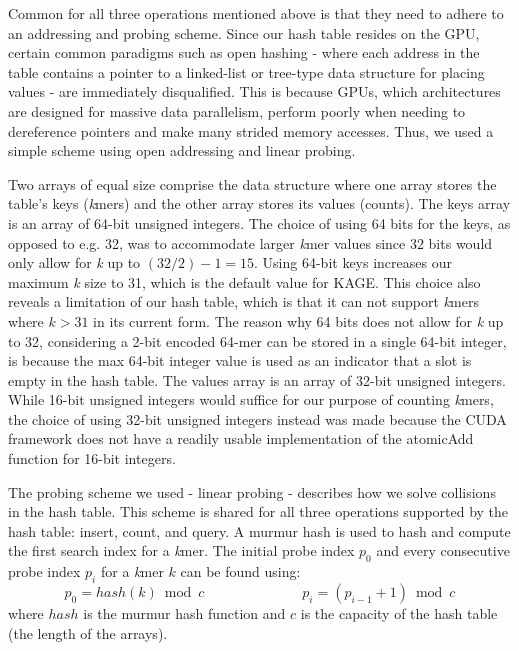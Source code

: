 Common for all three operations mentioned above is that they need to adhere to an addressing and probing scheme.
Since our hash table resides on the GPU, certain common paradigms such as open hashing - where each address in the table contains a pointer to a linked-list or tree-type data structure for placing values - are immediately disqualified.
This is because GPUs, which architectures are designed for massive data parallelism, perform poorly when needing to dereference pointers and make many strided memory accesses.
Thus, we used a simple scheme using open addressing and linear probing. 

Two arrays of equal size comprise the data structure where one array stores the table's keys (\textit{k}mers) and the other array stores its values (counts).
The keys array is an array of 64-bit unsigned integers.
The choice of using 64 bits for the keys, as opposed to e.g. 32, was to accommodate larger \textit{k}mer values since 32 bits would only allow for \textit{k} up to $(32/2)-1=15$.
Using 64-bit keys increases our maximum \textit{k} size to 31, which is the default value for KAGE.
This choice also reveals a limitation of our hash table, which is that it can not support \textit{k}mers where $k>31$ in its current form.
The reason why 64 bits does not allow for \textit{k} up to 32, considering a 2-bit encoded 64-mer can be stored in a single 64-bit integer, is because the max 64-bit integer value is used as an indicator that a slot is empty in the hash table.
The values array is an array of 32-bit unsigned integers.
While 16-bit unsigned integers would suffice for our purpose of counting \textit{k}mers, the choice of using 32-bit unsigned integers instead was made because the CUDA framework does not have a readily usable implementation of the atomicAdd function for 16-bit integers.

The probing scheme we used - linear probing - describes how we solve collisions in the hash table. 
This scheme is shared for all three operations supported by the hash table: insert, count, and query.
A murmur hash \cite{murmur} is used to hash and compute the first search index for a \textit{k}mer.
The initial probe index $p_0$ and every consecutive probe index $p_i$ for a \textit{k}mer $k$ can be found using:
\begin{equation}
  p_0=hash(k) \bmod c \hspace{7em} p_{i}=(p_{i-1}+1) \bmod c
\end{equation}
where $hash$ is the murmur hash function and $c$ is the capacity of the hash table (the length of the arrays).

